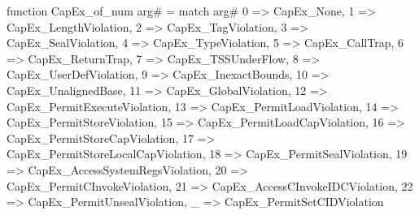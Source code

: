 function CapEx_of_num arg# = match arg# {
  0 => CapEx_None,
  1 => CapEx_LengthViolation,
  2 => CapEx_TagViolation,
  3 => CapEx_SealViolation,
  4 => CapEx_TypeViolation,
  5 => CapEx_CallTrap,
  6 => CapEx_ReturnTrap,
  7 => CapEx_TSSUnderFlow,
  8 => CapEx_UserDefViolation,
  9 => CapEx_InexactBounds,
  10 => CapEx_UnalignedBase,
  11 => CapEx_GlobalViolation,
  12 => CapEx_PermitExecuteViolation,
  13 => CapEx_PermitLoadViolation,
  14 => CapEx_PermitStoreViolation,
  15 => CapEx_PermitLoadCapViolation,
  16 => CapEx_PermitStoreCapViolation,
  17 => CapEx_PermitStoreLocalCapViolation,
  18 => CapEx_PermitSealViolation,
  19 => CapEx_AccessSystemRegsViolation,
  20 => CapEx_PermitCInvokeViolation,
  21 => CapEx_AccessCInvokeIDCViolation,
  22 => CapEx_PermitUnsealViolation,
  _ => CapEx_PermitSetCIDViolation
}
